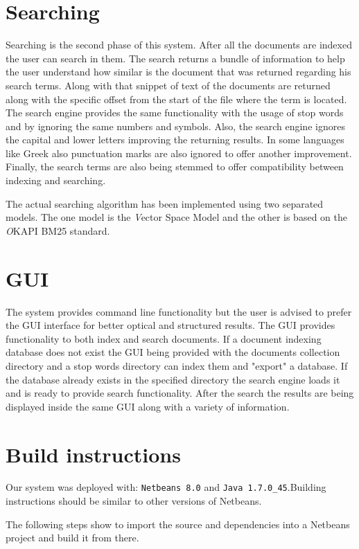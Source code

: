 \documentclass[letterpaper,twocolumn,10pt]{article}
\begin{document}
\section{Searching}
Searching is the second phase of this system. After all the documents are indexed the user can search in them. The search returns a bundle of information to help the user understand how similar is the document that was returned regarding his search terms. Along with that snippet of text of the documents are returned along with the specific offset from the start of the file where the term is located. The search engine provides the same functionality with the usage of stop words and by ignoring the same numbers and symbols. Also, the search engine ignores the capital and lower letters improving the returning results. In some languages like Greek also punctuation marks are also ignored to offer another improvement. Finally, the search terms are also being stemmed to offer compatibility between indexing and searching.

The actual searching algorithm has been implemented using two separated models. The one model is the {\emph Vector Space} Model and the other is based on the {\emph OKAPI BM25} standard.

\section{GUI}
The system provides command line functionality but the user is advised to prefer the GUI interface for better optical and structured results. The GUI provides functionality to both index and search documents. If a document indexing database does not exist the GUI being provided with the documents collection directory and a stop words directory can index them and "export" a database. If the database already exists in the specified directory the search engine loads it and is ready to provide search functionality. After the search the results are being displayed inside the same GUI along with a variety of information.

\section{Build instructions}
Our system was deployed with: {\tt Netbeans 8.0} and {\tt Java 1.7.0\_45}.Building instructions should be similar to other versions of Netbeans.

The following steps show to import the source and dependencies into a Netbeans project and build it from there.
\end{document}
